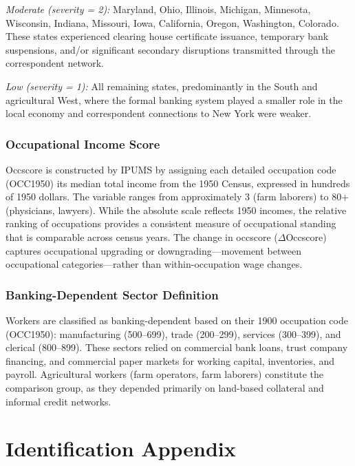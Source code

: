 \documentclass[12pt]{article}
\begin{document}
\textit{Moderate (severity = 2):} Maryland, Ohio, Illinois, Michigan, Minnesota, Wisconsin, Indiana, Missouri, Iowa, California, Oregon, Washington, Colorado. These states experienced clearing house certificate issuance, temporary bank suspensions, and/or significant secondary disruptions transmitted through the correspondent network.

\textit{Low (severity = 1):} All remaining states, predominantly in the South and agricultural West, where the formal banking system played a smaller role in the local economy and correspondent connections to New York were weaker.

\subsubsection*{Occupational Income Score} Occscore is constructed by IPUMS by assigning each detailed occupation code (OCC1950) its median total income from the 1950 Census, expressed in hundreds of 1950 dollars. The variable ranges from approximately 3 (farm laborers) to 80+ (physicians, lawyers). While the absolute scale reflects 1950 incomes, the relative ranking of occupations provides a consistent measure of occupational standing that is comparable across census years. The change in occscore ($\Delta$Occscore) captures occupational upgrading or downgrading---movement between occupational categories---rather than within-occupation wage changes.

\subsubsection*{Banking-Dependent Sector Definition} Workers are classified as banking-dependent based on their 1900 occupation code (OCC1950): manufacturing (500--699), trade (200--299), services (300--399), and clerical (800--899). These sectors relied on commercial bank loans, trust company financing, and commercial paper markets for working capital, inventories, and payroll. Agricultural workers (farm operators, farm laborers) constitute the comparison group, as they depended primarily on land-based collateral and informal credit networks.

\section{Identification Appendix}
\end{document}
